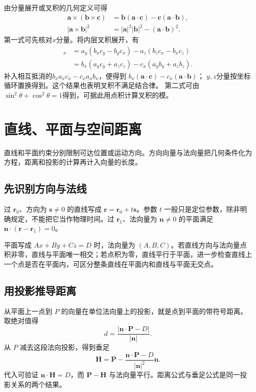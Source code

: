 \documentclass[11pt,openany,fontset=fandol]{ctexbook}
\theoremstyle{plain}\newtheorem{theorem}{定理}[chapter]\newtheorem{proposition}[theorem]{命题}
\theoremstyle{definition}\newtheorem{definition}{定义}[chapter]\newtheorem{example}{例}[chapter]
\theoremstyle{remark}\newtheorem*{remark}{说明}
\newcommand{\vct}[1]{\bm{#1}}\newcommand{\Rea}{\operatorname{Re}}\newcommand{\Ima}{\operatorname{Im}}
\begin{document}
由分量展开或叉积的几何定义可得
\begin{align}
\vct a\times(\vct b\times\vct c)
&=\vct b(\vct a\cdot\vct c)-\vct c(\vct a\cdot\vct b),\\
|\vct a\times\vct b|^2
&=|\vct a|^2|\vct b|^2-(\vct a\cdot\vct b)^2.
\end{align}
第一式可先核对$x$分量。将内层叉积展开，有
\begin{align*}
[\vct a\times(\vct b\times\vct c)]_x
&=a_y(b_xc_y-b_yc_x)-a_z(b_zc_x-b_xc_z)\\
&=b_x(a_yc_y+a_zc_z)-c_x(a_yb_y+a_zb_z).
\end{align*}
补入相互抵消的$b_xa_xc_x-c_xa_xb_x$，便得到
$b_x(\vct a\cdot\vct c)-c_x(\vct a\cdot\vct b)$；
$y,z$分量按坐标循环置换得到。这个结果也表明叉积不满足结合律。
第二式可由$\sin^2\theta+\cos^2\theta=1$得到，可据此用点积计算叉积的模。

\section{直线、平面与空间距离}
直线和平面约束分别限制可达位置或运动方向。方向向量与法向量把几何条件化为方程，距离和投影的计算再计入向量的长度。

\subsection{先识别方向与法线}
过 $\vct r_0$、方向为 $\vct s\ne0$ 的直线写成 $\vct r=\vct r_0+t\vct s$。参数 $t$ 一般只是定位参数，除非明确规定，不能把它当作物理时间。过 $\vct r_1$、法向量为 $\vct n\ne0$ 的平面满足 $\vct n\cdot(\vct r-\vct r_1)=0$。

平面写成 $Ax+By+Cz=D$ 时，法向量为 $(A,B,C)$。若直线方向与法向量点积非零，直线与平面唯一相交；若点积为零，直线平行于平面，进一步检查直线上一个点是否在平面内，可区分整条直线在平面内和直线与平面无交点。

\subsection{用投影推导距离}
从平面上一点到 $P$ 的向量在单位法向量上的投影，就是点到平面的带符号距离。取绝对值得
\begin{equation}
d=\frac{|\vct n\cdot\vct P-D|}{|\vct n|}.
\end{equation}
从 $P$ 减去这段法向投影，得到垂足
\begin{equation}
\vct H=\vct P-\frac{\vct n\cdot\vct P-D}{|\vct n|^2}\vct n.
\end{equation}
代入可验证 $\vct n\cdot\vct H=D$，而 $\vct P-\vct H$ 与法向量平行。距离公式与垂足公式是同一投影关系的两个结果。
\end{document}
